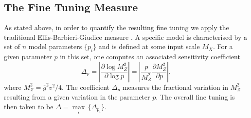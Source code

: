 \documentclass[preprint,amsmath,amssymb,aps,superscriptaddress,prd,showpacs,floatfix,nofootinbib]{revtex4-1}
\begin{document}
\subsection{\label{subsec:tuningmeasure}The Fine Tuning Measure}
As stated above, in order to quantify the resulting fine tuning we
apply the traditional Ellis-Barbieri-Giudice measure
\cite{Ellis:1986yg,Barbieri:1987fn}. A specific model is characterised
by a set of $n$ model parameters $\{p_i\}$ and is defined at some
input scale $M_X$. For a given parameter $p$ in this set, one computes
an associated sensitivity coefficient \cite{Feng:2013pwa}
\begin{equation}\label{eq:bgmeasure}
\Delta_p=\left | \frac{\partial \log M_Z^2}{\partial \log p}\right
|=\left | \frac{p}{M_Z^2}\frac{\partial M_Z^2}{\partial p}\right |,
\end{equation}
where $M_Z^2=\bar{g}^2v^2/4$. The coefficient $\Delta_p$ measures the
fractional variation in $M_Z^2$ resulting from a given variation in
the parameter $p$. The overall fine tuning is then taken to be $\Delta
= \underset{i}{\max}\,\{\Delta_{p_i}\}$.\\ \\
\end{document}
